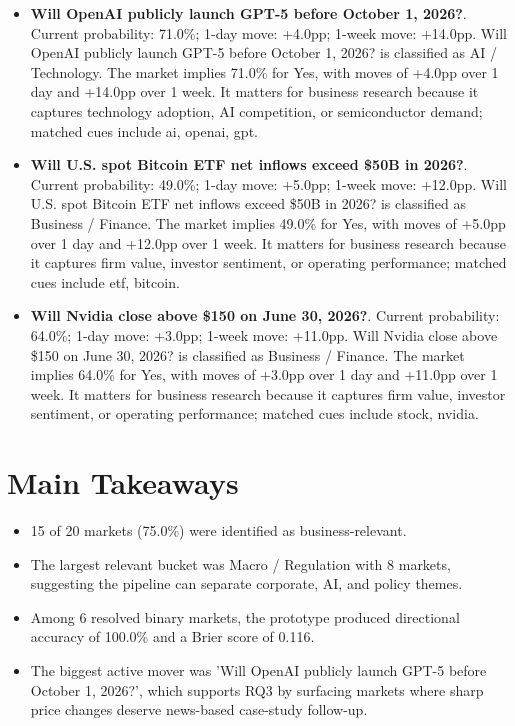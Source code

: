 \documentclass[12pt]{article}
\begin{document}
\begin{itemize}
\item \textbf{Will OpenAI publicly launch GPT-5 before October 1, 2026?}. Current probability: 71.0\%; 1-day move: +4.0pp; 1-week move: +14.0pp. Will OpenAI publicly launch GPT-5 before October 1, 2026? is classified as AI / Technology. The market implies 71.0\% for Yes, with moves of +4.0pp over 1 day and +14.0pp over 1 week. It matters for business research because it captures technology adoption, AI competition, or semiconductor demand; matched cues include ai, openai, gpt.
\item \textbf{Will U.S. spot Bitcoin ETF net inflows exceed \$50B in 2026?}. Current probability: 49.0\%; 1-day move: +5.0pp; 1-week move: +12.0pp. Will U.S. spot Bitcoin ETF net inflows exceed \$50B in 2026? is classified as Business / Finance. The market implies 49.0\% for Yes, with moves of +5.0pp over 1 day and +12.0pp over 1 week. It matters for business research because it captures firm value, investor sentiment, or operating performance; matched cues include etf, bitcoin.
\item \textbf{Will Nvidia close above \$150 on June 30, 2026?}. Current probability: 64.0\%; 1-day move: +3.0pp; 1-week move: +11.0pp. Will Nvidia close above \$150 on June 30, 2026? is classified as Business / Finance. The market implies 64.0\% for Yes, with moves of +3.0pp over 1 day and +11.0pp over 1 week. It matters for business research because it captures firm value, investor sentiment, or operating performance; matched cues include stock, nvidia.
\end{itemize}

\section{Main Takeaways}

\begin{itemize}
\item 15 of 20 markets (75.0\%) were identified as business-relevant.
\item The largest relevant bucket was Macro / Regulation with 8 markets, suggesting the pipeline can separate corporate, AI, and policy themes.
\item Among 6 resolved binary markets, the prototype produced directional accuracy of 100.0\% and a Brier score of 0.116.
\item The biggest active mover was 'Will OpenAI publicly launch GPT-5 before October 1, 2026?', which supports RQ3 by surfacing markets where sharp price changes deserve news-based case-study follow-up.
\end{itemize}
\end{document}
